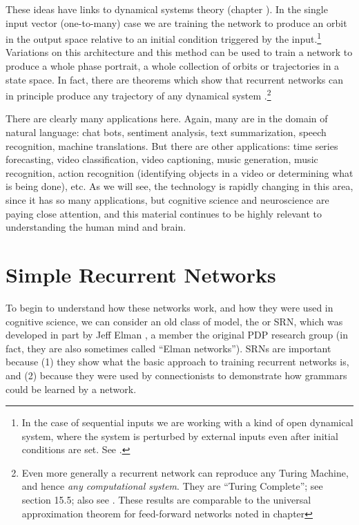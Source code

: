 These ideas have links to dynamical systems theory (chapter ). In the single input vector (one-to-many) case we are training the network to produce an orbit in the output space relative to an initial condition triggered by the input.\footnote{In the case of sequential inputs we are working with a kind of open dynamical system, where the system is perturbed by external inputs even after initial conditions are set. See \cite{hotton2011extending}.} Variations on this architecture and this method can be used to train a network to produce a whole phase portrait, a whole collection of orbits or trajectories in a state space. In fact, there are theorems which show that recurrent networks can in principle produce any trajectory of any dynamical system \cite{funahashi1993approximation}.\footnote{Even more generally a recurrent network can reproduce any Turing Machine, and hence \emph{any computational system}. They are ``Turing Complete''; see \cite{haykin1998neural} section 15.5; also see . These results are comparable to the universal approximation theorem for feed-forward networks noted in chapter } 

There are clearly many applications here. Again, many are in the domain of natural language: chat bots, sentiment analysis, text summarization, speech recognition, machine translations. But there are other applications: time series forecasting, video classification, video captioning, music generation, music recognition,  action recognition (identifying objects in a video or determining what is being done), etc. As we will see, the technology is rapidly changing in this area, since it has so many applications, but cognitive science and neuroscience are paying close attention, and this material continues to be highly relevant to understanding the human mind and brain.

\section{Simple Recurrent Networks}\label{sect_srn}

To begin to understand how these networks work, and how they were used in cognitive science, we can consider an old class of model, the  or SRN, which was developed in part by Jeff Elman \cite{elman1990finding}, a member the original PDP research group  (in fact, they are also sometimes called ``Elman networks''). SRNs are important because (1) they show what the basic approach to training recurrent networks is, and (2) because they were used by connectionists to demonstrate how grammars could be learned by a network. 

